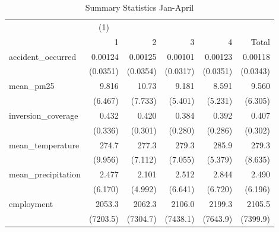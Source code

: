 \begin{table}[htbp]\centering
\caption{Summary Statistics Jan-April\label{sumstats1-4}}
\begin{tabular}{l*{5}{D{.}{.}{-1}}}
\toprule
                    &&            &            &            &            \\
                    &           1&           2&           3&           4&       Total\\
\midrule
accident\_occurred   &     0.00124&     0.00125&     0.00101&     0.00123&     0.00118\\
                    &    (0.0351)&    (0.0354)&    (0.0317)&    (0.0351)&    (0.0343)\\
\addlinespace
mean\_pm25           &       9.816&       10.73&       9.181&       8.591&       9.560\\
                    &     (6.467)&     (7.733)&     (5.401)&     (5.231)&     (6.305)\\
\addlinespace
inversion\_coverage  &       0.432&       0.420&       0.384&       0.392&       0.407\\
                    &     (0.336)&     (0.301)&     (0.280)&     (0.286)&     (0.302)\\
\addlinespace
mean\_temperature    &       274.7&       277.3&       279.3&       285.9&       279.3\\
                    &     (9.956)&     (7.112)&     (7.055)&     (5.379)&     (8.635)\\
\addlinespace
mean\_precipitation  &       2.477&       2.101&       2.512&       2.844&       2.490\\
                    &     (6.170)&     (4.992)&     (6.641)&     (6.720)&     (6.196)\\
\addlinespace
employment          &      2053.3&      2062.3&      2106.0&      2199.3&      2105.5\\
                    &    (7203.5)&    (7304.7)&    (7438.1)&    (7643.9)&    (7399.9)\\
\bottomrule
\end{tabular}
\end{table}
